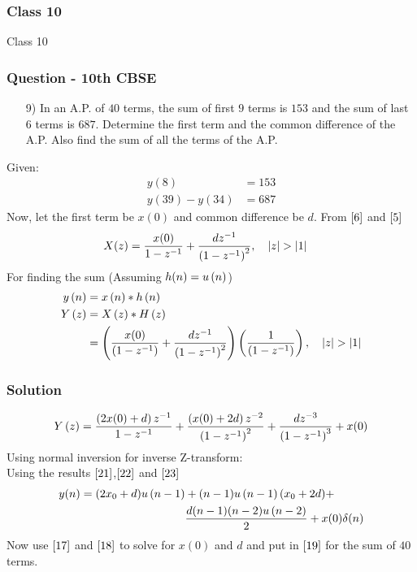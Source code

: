 \documentclass{beamer}
\begin{document}
\begin{frame}
\frametitle{Class 10}
    Class 10
\end{frame}





\begin{frame}
\frametitle{Question - 10th CBSE}
\begin{enumerate}
    \item [9)]
In an A.P. of $40$ terms, the sum of first $9$ terms is $153$ and the sum of last $6$ terms is $687$. Determine the first term and the common difference of the A.P. Also find the sum of all the terms of the A.P. 
\end{enumerate}
\end{frame}
Given:
\begin{align}
y(8) &= 153 \label{17}\\
y(39)-y(34) &= 687 \label{18}
\end{align}
Now, let the first term be $x(0)$ and common difference be $d$. From $\eqref{6}$ and $\eqref{5}$
\begin{align}
    X(z) &= \dfrac{x(0)}{1-z^{-1}} + \dfrac{dz^{-1}}{\left(1-z^{-1}\right)^2} ,\quad \left\vert z\right\vert>\left\vert1\right\vert 
\end{align}
For finding the sum (Assuming $h(n)=u\left(n\right)$)
\begin{align}
    y\left(n\right) &= x\left(n\right) * h\left(n\right)\\
Y\left(z\right) &= X\left(z\right) * H\left(z\right)\\
&= \left(\frac{x(0)}{\left(1-z^{-1}\right)} +
\frac{dz^{-1}}{\left(1-z^{-1}\right)^{2}}\right)\left(\frac{1}{\left(1-z^{-1}\right)}\right)
,\quad \left\vert z\right\vert>\left\vert1\right\vert     
\end{align}







\begin{frame}
\frametitle{Solution}
\begin{align}
 Y\left(z\right)   = \frac{\left(2x(0)+d\right)z^{-1}}{1-z^{-1}} + \frac{\left(x(0)+2d\right)z^{-2}}{\left(1-z^{-1}\right)^2} + \frac{dz^{-3}}{\left(1-z^{-1}\right)^{3}} + x(0)
\end{align}
Using normal inversion for inverse Z-transform:\\
Using the results $\eqref{21}$,$\eqref{22}$ and $\eqref{23}$
\begin{align}
   y(n) = (2x_0+d)u\left(n-1\right) &+ (n-1)u\left(n-1\right)(x_0+2d) + \notag\\
    &\frac{d(n-1)(n-2)u\left(n-2\right)}{2} + x(0)\delta(n)
\end{align}
Now use $\eqref{17}$ and $\eqref{18}$ to solve for $x(0)$ and $d$ and put in $\eqref{19}$ for the sum of $40$ terms.
\end{frame}
\end{document}
